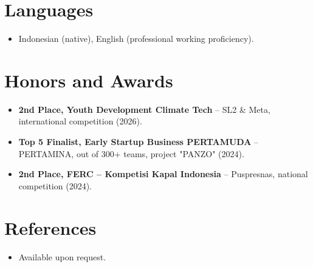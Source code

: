 \documentclass[11pt,a4paper,sans]{moderncv}
\begin{document}

\section{Languages}
\vspace{1pt}
\begin{itemize}
\item Indonesian (native), English (professional working proficiency).
\end{itemize}


\section{Honors and Awards}
\vspace{1pt}
\begin{itemize}
\item{\textbf{2nd Place, Youth Development Climate Tech} -- SL2 \& Meta, international competition (2026).}
\item{\textbf{Top 5 Finalist, Early Startup Business PERTAMUDA} -- PERTAMINA, out of 300+ teams, project "PANZO" (2024).}
\item{\textbf{2nd Place, FERC -- Kompetisi Kapal Indonesia} -- Puspresnas, national competition (2024).}
\end{itemize}


\section{References}
\vspace{1pt}
\begin{itemize}
\item{Available upon request.}
\end{itemize}
\end{document}
